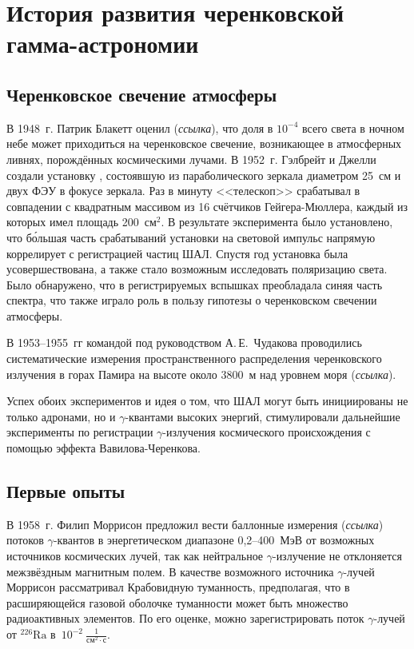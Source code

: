 \documentclass[magd,floatypics,numeref]{msudipl} %
\begin{document}
\section{История развития черенковской гамма-астрономии}
\subsection{Черенковское свечение атмосферы}
В 1948~г. Патрик Блакетт оценил (\textit{ссылка}), что доля в $10^{-4}$ всего света в ночном небе может приходиться на черенковское свечение, возникающее в атмосферных ливнях, порождённых космическими лучами. В 1952~г. Гэлбрейт и Джелли создали установку \cite{galbraith1953light}, состоявшую из параболического зеркала диаметром 25~см и двух ФЭУ в фокусе зеркала. Раз в минуту <<телескоп>> срабатывал в совпадении с квадратным массивом из 16 счётчиков Гейгера-Мюллера, каждый из которых имел площадь 200~$\text{см}^2$. В результате эксперимента было установлено, что б\'ольшая часть срабатываний установки на световой импульс напрямую коррелирует с регистрацией частиц ШАЛ. Спустя год установка была усовершествована, а также стало возможным исследовать поляризацию света. Было обнаружено, что в регистрируемых вспышках преобладала синяя часть спектра, что также играло роль в пользу гипотезы о черенковском свечении атмосферы.  

В 1953--1955~гг командой под руководством А.\,Е.~Чудакова проводились систематические измерения пространственного распределения черенковского излучения в горах Памира на высоте около 3800~м над уровнем моря (\textit{ссылка}).

Успех обоих экспериментов и идея о том, что ШАЛ могут быть инициированы не только адронами, но и $\gamma$-квантами высоких энергий, стимулировали дальнейшие эксперименты по регистрации $\gamma$-излучения космического происхождения с помощью эффекта Вавилова-Черенкова. 
\subsection{Первые опыты}
В 1958~г. Филип Моррисон предложил вести баллонные измерения  (\textit{ссылка}) потоков $\gamma$-квантов в энергетическом диапазоне 0,2--400~МэВ от возможных источников космических лучей, так как нейтральное  $\gamma$-излучение не отклоняется межзвёздным магнитным полем. В качестве возможного источника $\gamma$-лучей Моррисон рассматривал Крабовидную туманность, предполагая, что в расширяющейся газовой оболочке туманности может быть множество радиоактивных элементов. По его оценке, можно зарегистрировать поток $\gamma$-лучей от $^{226}\text{Ra}$ в~$10^{-2}~\frac{1}{\text{см}^2\cdot\text{с}}$.
\end{document}
